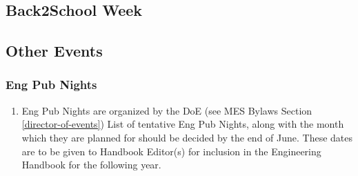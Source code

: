 \subsection{Back2School Week}
\label{back2school-week}

\subsection{Other Events}
\label{other-events}

\subsubsection{Eng Pub Nights}
\label{eng-pub-nights}
\begin{enumerate}
 \item
  Eng Pub Nights are organized by the DoE (see MES Bylaws Section \ref{director-of-events})
  List of tentative Eng Pub Nights, along with the month which they are planned for should be decided by the end of June. These dates are to be given to Handbook Editor(s) for inclusion in the Engineering Handbook for the following year.
\end{enumerate}
